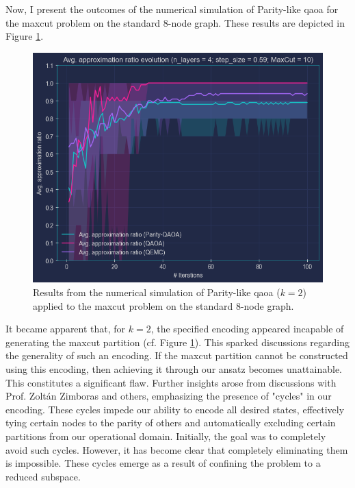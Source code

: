Now, I present the outcomes of the numerical simulation of Parity-like \acrshort{qaoa} for the \acrshort{maxcut} problem on the standard $8$-node graph. These results are depicted in Figure \ref{fig:parity_qaoa_results}.
\begin{figure}[t]
    \centering
    \includegraphics[width=1\textwidth]{Figures/Chapter_6/Parity_QAOA.png}
    \caption{Results from the numerical simulation of Parity-like \acrshort{qaoa} ($k=2$) applied to the \acrshort{maxcut} problem on the standard $8$-node graph.}
    \label{fig:parity_qaoa_results}
\end{figure}
It became apparent that, for $k = 2$, the specified encoding appeared incapable of generating the \acrshort{maxcut} partition (cf. Figure \ref{fig:parity_qaoa_results}). This sparked discussions regarding the generality of such an encoding. If the \acrshort{maxcut} partition cannot be constructed using this encoding, then achieving it through our ansatz becomes unattainable. This constitutes a significant flaw. Further insights arose from discussions with Prof. Zoltán Zimboras and others, emphasizing the presence of "cycles" in our encoding. These cycles impede our ability to encode all desired states, effectively tying certain nodes to the parity of others and automatically excluding certain partitions from our operational domain. Initially, the goal was to completely avoid such cycles. However, it has become clear that completely eliminating them is impossible. These cycles emerge as a result of confining the problem to a reduced subspace.

